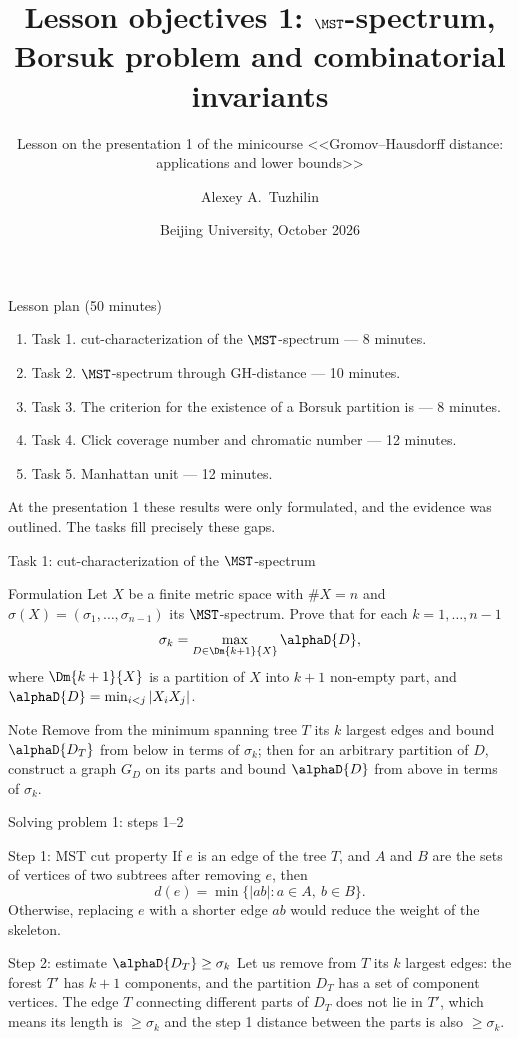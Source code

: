 \documentclass[aspectratio=169,11pt]{beamer}
\title[Lesson 1 objectives]{Lesson objectives \textup{1}: $\MST$-spectrum, Borsuk problem and combinatorial invariants}
\subtitle{Lesson on the presentation \textup{1} of the minicourse <<Gromov--Hausdorff distance: applications and lower bounds>>}
\author{Alexey A.~Tuzhilin}
\date{Beijing University, October 2026}
\begin{document}
\begin{frame}
\titlepage
\end{frame}

\begin{frame}{Lesson plan (\textup{50} minutes)}
\begin{enumerate}
\item Task \textup{1}. \textup{cut}-characterization of the $\MST$-spectrum --- \textup{8} minutes.
\item Task \textup{2}. $\MST$-spectrum through GH-distance --- \textup{10} minutes.
\item Task \textup{3}. The criterion for the existence of a Borsuk partition is --- \textup{8} minutes.
\item Task \textup{4}. Click coverage number and chromatic number --- \textup{12} minutes.
\item Task \textup{5}. Manhattan unit --- \textup{12} minutes.
\end{enumerate}
\medskip
At the presentation \textup{1} these results were only formulated, and the evidence was outlined. The tasks fill precisely these gaps.
\end{frame}

\begin{frame}{Task \textup{1}: \textup{cut}-characterization of the $\MST$-spectrum}
\begin{block}{Formulation}
Let $X$ be a finite metric space with $\#X = n$ and $\sigma(X) = (\sigma_1, \dots, \sigma_{n-1})$ its $\MST$-spectrum. Prove that for each $k = 1, \dots, n-1$
\[
\sigma_k = \max_{D \in \Dm{k+1}{X}} \alphaD{D},
\]
where $\Dm{k+1}{X}$ is a partition of $X$ into $k+1$ non-empty part, and $\alphaD{D} = \min_{i<j} |X_i X_j|$.
\end{block}
\begin{block}{Note}
Remove from the minimum spanning tree $T$ its $k$ largest edges and bound $\alphaD{D_T}$ from below in terms of $\sigma_k$\textup{;} then for an arbitrary partition of $D$, construct a graph $G_D$ on its parts and bound $\alphaD{D}$ from above in terms of $\sigma_k$.
\end{block}
\end{frame}

\begin{frame}{Solving problem \textup{1}: steps \textup{1}--\textup{2}}
\begin{block}{Step \textup{1}: MST cut property}
If $e$ is an edge of the tree $T$, and $A$ and $B$ are the sets of vertices of two subtrees after removing $e$, then
\[
d(e) = \min\bigl\{ |ab| : a \in A,\ b \in B \bigr\}.
\]
Otherwise, replacing $e$ with a shorter edge $ab$ would reduce the weight of the skeleton.
\end{block}
\begin{block}{Step \textup{2}: estimate $\alphaD{D_T} \ge \sigma_k$}
Let us remove from $T$ its $k$ largest edges: the forest $T'$ has $k+1$ components, and the partition $D_T$ has a set of component vertices. The edge $T$ connecting different parts of $D_T$ does not lie in $T'$, which means its length is $\ge \sigma_k$ and the step \textup{1} distance between the parts is also $\ge \sigma_k$.
\end{block}
\end{frame}
\end{document}
